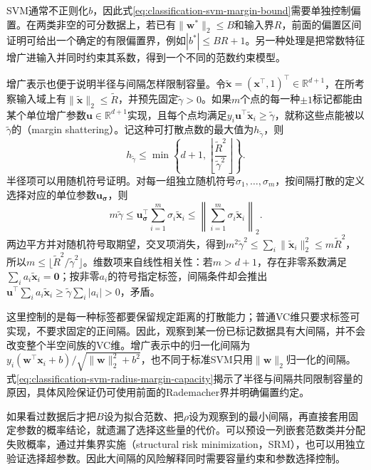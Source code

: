 SVM通常不正则化$b$，因此式\eqref{eq:classification-svm-margin-bound}需要单独控制偏置。在两类非空的可分数据上，若已有$\lVert\bm{w}^{\ast}\rVert_2\le B$和输入界$R$，前面的偏置区间证明可给出一个确定的有限偏置界，例如$|b^{\ast}|\le BR+1$。另一种处理是把常数特征增广进输入并同时约束其系数，得到一个不同的范数约束模型。

增广表示也便于说明半径与间隔怎样限制容量。令$\widetilde{\bm{x}}=(\bm{x}^{\top},1)^{\top}\in\mathbb{R}^{d+1}$，在所考察输入域上有$\lVert\widetilde{\bm{x}}\rVert_2\le\widetilde R$，并预先固定$\widetilde\gamma>0$。如果$m$个点的每一种$\pm1$标记都能由某个单位增广参数$\bm{u}\in\mathbb{R}^{d+1}$实现，且每个点均满足$y_i\bm{u}^{\top}\widetilde{\bm{x}}_i\ge\widetilde\gamma$，就称这些点能被以$\widetilde\gamma$的（margin shattering）。记这种可打散点数的最大值为$h_{\widetilde\gamma}$，则
\begin{equation}
  h_{\widetilde\gamma}
  \le\min\left\{
      d+1,\left\lfloor
        \frac{\widetilde R^2}{\widetilde\gamma^2}
      \right\rfloor
    \right\}.
  \label{eq:classification-svm-radius-margin-capacity}
\end{equation}
半径项可以用随机符号证明。对每一组独立随机符号$\sigma_1,\ldots,\sigma_m$，按间隔打散的定义选择对应的单位参数$\bm{u}_{\bm{\sigma}}$，则
\[
  m\widetilde\gamma
  \le\bm{u}_{\bm{\sigma}}^{\top}
       \sum_{i=1}^m\sigma_i\widetilde{\bm{x}}_i
  \le\left\lVert
       \sum_{i=1}^m\sigma_i\widetilde{\bm{x}}_i
     \right\rVert_2.
\]
两边平方并对随机符号取期望，交叉项消失，得到$m^2\widetilde\gamma^2\le\sum_i\lVert\widetilde{\bm{x}}_i\rVert_2^2\le m\widetilde R^2$，所以$m\le\lfloor\widetilde R^2/\widetilde\gamma^2\rfloor$。维数项来自线性相关性：若$m>d+1$，存在非零系数满足$\sum_i a_i\widetilde{\bm{x}}_i=\bm{0}$；按非零$a_i$的符号指定标签，间隔条件却会推出$\bm{u}^{\top}\sum_i a_i\widetilde{\bm{x}}_i\ge\widetilde\gamma\sum_i|a_i|>0$，矛盾。

这里控制的是每一种标签都要保留规定距离的打散能力；普通VC维只要求标签可实现，不要求固定的正间隔。因此，观察到某一份已标记数据具有大间隔，并不会改变整个半空间族的VC维。增广表示中的归一化间隔为$y_i(\bm{w}^{\top}\bm{x}_i+b)/\sqrt{\lVert\bm{w}\rVert_2^2+b^2}$，也不同于标准SVM只用$\lVert\bm{w}\rVert_2$归一化的间隔。式\eqref{eq:classification-svm-radius-margin-capacity}揭示了半径与间隔共同限制容量的原因，具体风险保证仍可使用前面的Rademacher界并明确偏置约定。

如果看过数据后才把$B$设为拟合范数、把$\rho$设为观察到的最小间隔，再直接套用固定参数的概率结论，就遗漏了选择这些量的代价。可以预设一列嵌套范数类并分配失败概率，通过并集界实施（structural risk minimization，SRM），也可以用独立验证选择超参数。因此大间隔的风险解释同时需要容量约束和参数选择控制。

